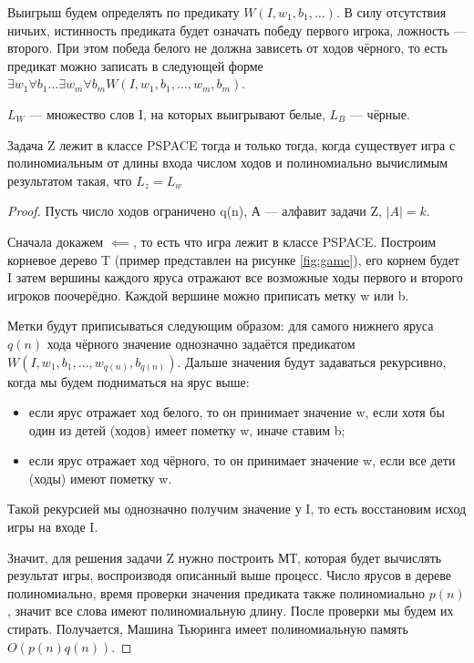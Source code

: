 Выигрыш будем определять по предикату $W(I, w_1, b_1,
\ldots)$. В силу отсутствия ничьих, истинность предиката будет означать победу
первого игрока, ложность --- второго. При этом победа белого не должна зависеть
от ходов чёрного, то есть предикат можно записать в следующей форме $\exists w_1
\forall b_1 \ldots \exists w_m \forall b_m W(I, w_1,
b_1,\ldots, w_m, b_m)$.

$L_W$ --- множество слов I, на которых выигрывают белые, $L_B$ --- чёрные. 
\begin{theorem}
Задача Z лежит в классе PSPACE тогда и только тогда, когда существует игра с
полиномиальным от длины входа числом ходов и полиномиально вычислимым
результатом такая, что $L_z=L_w$	
\end{theorem}
\begin{proof}
	Пусть число ходов ограничено q(n), А --- алфавит задачи Z, $|A| = k$.
	
	Сначала докажем $\impliedby$, то есть что игра лежит в классе PSPACE.
	Построим корневое дерево T (пример представлен на рисунке \ref{fig:game}), его
	корнем будет I затем вершины каждого яруса отражают все возможные ходы первого и
	второго игроков поочерёдно. Каждой вершине можно приписать метку w или
	b.

\begin{figure*}[h!]
    \centering
    \caption{Пример графа, отражающего игру двух лиц}
    \label{fig:game}
\end{figure*}
	Метки будут приписываться следующим образом: для самого нижнего яруса
	$q(n)$ хода чёрного значение однозначно задаётся предикатом  $W(I, w_1,
	b_1, \ldots, w_{q(n)}, b_{q(n)})$. Дальше значения будут задаваться
	рекурсивно, когда мы будем подниматься на ярус выше: 
	\begin{itemize}
		\item если ярус отражает
	ход белого, то он принимает значение w, если хотя бы один из детей
	(ходов) имеет пометку w, иначе ставим b;
		\item если ярус отражает ход чёрного, то он принимает значение
			w, если все дети (ходы) имеют пометку w.
	\end{itemize}

	Такой рекурсией мы однозначно получим значение у I, то есть восстановим
	исход игры на входе I. 

	Значит, для решения задачи Z нужно построить МТ, которая будет вычислять
	результат игры, воспроизводя описанный выше процесс. Число ярусов в
	дереве полиномиально, время проверки значения предиката также
	полиномиально $p(n)$, значит все слова имеют полиномиальную длину. После
	проверки мы будем их стирать. Получается, Машина Тьюринга имеет
	полиномиальную память $O(p(n)q(n))$.


\end{proof}
